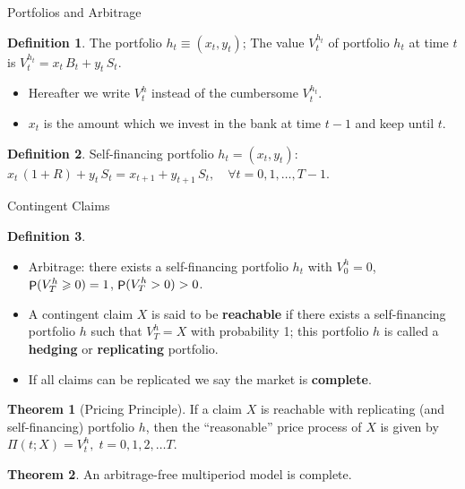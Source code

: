 \documentclass[10pt,handout]{beamer}
\newcommand{\ds}{\displaystyle}
\DeclareMathOperator\prb{{\sf P}}
\theoremstyle{definition}
\newtheorem*{dfn}{Definition}
\newtheorem*{thm}{Theorem}
\begin{document}
\begin{frame}{Portfolios and Arbitrage}
\begin{dfn}
  The portfolio $h_t \equiv (x_t, y_t)$; The value $V_t^{h_t}$ of portfolio $h_t$ at time $t$ is $\ds V_t^{h_t} = x_t\,B_t + y_t\,S_t$.
\end{dfn}
\begin{itemize}
  \item Hereafter we write $V_t^h$ instead of the cumbersome $V_t^{h_t}$. 
  \item $x_t$ is the amount which we invest in the bank at time $t-1$ and keep until $t$.
\end{itemize}
\begin{dfn}
  Self-financing portfolio $h_t=(x_t, y_t)$: $\ds x_t\,(1 + R) + y_t\,S_t = x_{t+1} + y_{t+1}\,S_t,\quad\forall t = 0, 1, \ldots, T-1.$
\end{dfn}
\end{frame}

\begin{frame}{Contingent Claims}
\begin{dfn}
  \begin{itemize}
    \item Arbitrage: there exists a self-financing portfolio $h_t$ with $\ds V_0^h = 0$, $\prb(V_T^h\geqslant 0) = 1$, $\ds\prb(V_T^h>0) > 0$.
    \item A contingent claim $X$ is said to be \textbf{reachable} if there exists a self-financing portfolio $h$ such that $V_T^h = X$ with probability 1; this portfolio $h$ is called a \textbf{hedging} or \textbf{replicating} portfolio. 
    \item If all claims can be replicated we say the market is \textbf{complete}. 
  \end{itemize}
\end{dfn}

\begin{thm}[Pricing Principle]
  If a claim $X$ is reachable with replicating (and self-financing) portfolio $h$, then the ``reasonable'' price process of $X$ is given by $\ds \Pi(t; X) = V_t^h, \; t=0, 1, 2, \ldots T$.
\end{thm}

\begin{thm}
  An arbitrage-free multiperiod model is complete.
\end{thm}
\end{frame}
  
\end{document}
